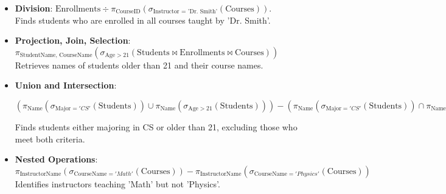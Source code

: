 \begin{itemize}[noitemsep,leftmargin=*]
\item[]{\textbf{Division}:
$\text{Enrollments} \div \pi_{\text{CourseID}}(\sigma_{\text{Instructor = 'Dr. Smith'}}(\text{Courses}))$. \\
Finds students who are enrolled in all courses taught by 'Dr. Smith'.}


\item[]{\textbf{Projection, Join, Selection}: \\
$\pi_{\text{StudentName, CourseName}} (\sigma_{\text{Age} > 21} (\text{Students} \bowtie \text{Enrollments} \bowtie \text{Courses}))$ \\
Retrieves names of students older than 21 and their course names.}

\item[]{\textbf{Union and Intersection}: \\
\vspace{-0.2cm}
\begin{center}
$\left( \pi_{\text{Name}} (\sigma_{\text{Major} = 'CS'}(\text{Students})) \cup \pi_{\text{Name}} (\sigma_{\text{Age} > 21}(\text{Students})) \right) -  \left( \pi_{\text{Name}} (\sigma_{\text{Major} = 'CS'}(\text{Students})) \cap \pi_{\text{Name}} (\sigma_{\text{Age} > 21}(\text{Students})) \right)$ \\
\end{center}
Finds students either majoring in CS or older than 21, excluding those who meet both criteria.}

\item[]{\textbf{Nested Operations}: \\
$\pi_{\text{InstructorName}} (\sigma_{\text{CourseName} = 'Math'}(\text{Courses})) - \pi_{\text{InstructorName}} (\sigma_{\text{CourseName} = 'Physics'}(\text{Courses}))$ \\
Identifies instructors teaching 'Math' but not 'Physics'.}

\end{itemize}
